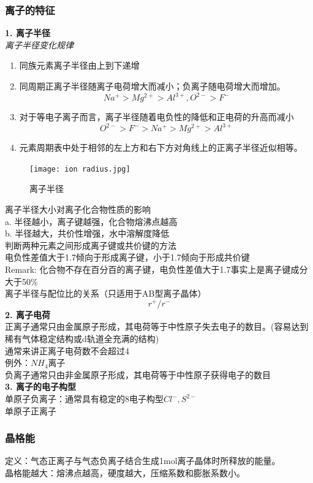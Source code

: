 \documentclass[utf8,a4paper,12pt]{ctexart}
\begin{document}
\subsubsection{离子的特征}
{\bf 1. 离子半径}\\
\emph{离子半径变化规律}
\begin{enumerate}[1)]
\item 同族元素离子半径由上到下递增
\item 同周期正离子半径随离子电荷增大而减小；负离子随电荷增大而增加。
\[Na^+>Mg^{2+}>Al^{3+}, O^{2-}>F^-\]
\item 对于等电子离子而言，离子半径随着电负性的降低和正电荷的升高而减小
\[ O^{2-}>F^->Na^+>Mg^{2+}>Al^{3+}\]
\item 元素周期表中处于相邻的左上方和右下方对角线上的正离子半径近似相等。
\end{enumerate}
\begin{figure}[H]
\centering
\texttt{[image: ion radius.jpg]}
\caption{离子半径}
\end{figure}
离子半径大小对离子化合物性质的影响\\
a. 半径越小，离子键越强，化合物熔沸点越高\\
b. 半径越大，共价性增强，水中溶解度降低\\
判断两种元素之间形成离子键或共价键的方法\\
电负性差值大于1.7倾向于形成离子键，小于1.7倾向于形成共价键\\
Remark: 化合物不存在百分百的离子键，电负性差值大于1.7事实上是离子键成分大于50\%\\
离子半径与配位比的关系（只适用于AB型离子晶体）\\
\[r^+/r^-\]
{\bf 2. 离子电荷}\\
正离子通常只由金属原子形成，其电荷等于中性原子失去电子的数目。(容易达到稀有气体稳定结构或d轨道全充满的结构)\\
通常来讲正离子电荷数不会超过4\\
例外：$NH_4$离子\\
负离子通常只由非金属原子形成，其电荷等于中性原子获得电子的数目\\
{\bf 3. 离子的电子构型}\\
单原子负离子：通常具有稳定的8电子构型$Cl^-,S^{2-}$\\
单原子正离子\\
\subsubsection{晶格能}
定义：气态正离子与气态负离子结合生成1mol离子晶体时所释放的能量。\\
晶格能越大：熔沸点越高，硬度越大，压缩系数和膨胀系数小。
\end{document}
